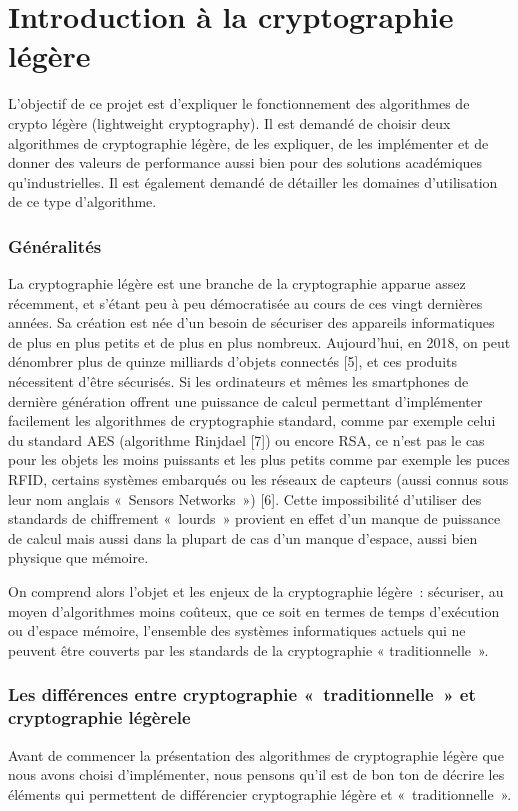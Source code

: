 \newpage
\part{Introduction à la cryptographie légère}

	L'objectif de ce projet est d'expliquer le fonctionnement des algorithmes de crypto légère (lightweight cryptography).
	Il est demandé de choisir deux algorithmes de cryptographie légère, de les expliquer,
	de les implémenter et de donner des valeurs de performance aussi bien pour des solutions académiques qu'industrielles.
	Il est également demandé de détailler les domaines d'utilisation de ce type d'algorithme.

	\section{Généralités}

	La cryptographie légère est une branche de la cryptographie apparue assez
	récemment,  et s’étant peu à peu démocratisée au cours de ces vingt dernières
	années. Sa création est née d’un besoin de sécuriser des appareils
	informatiques de plus en plus petits et de plus en plus nombreux. Aujourd’hui,
	en 2018, on peut dénombrer  plus de  quinze milliards d’objets connectés [5],
	et ces produits nécessitent d’être sécurisés. Si les ordinateurs et mêmes les
	smartphones de dernière génération offrent une puissance de calcul permettant
	d’implémenter facilement les algorithmes de cryptographie standard, comme par
	exemple celui du standard AES (algorithme Rinjdael [7]) ou encore RSA, ce
	n’est pas le cas pour les objets les moins puissants et les plus petits comme
	par exemple les puces RFID, certains systèmes embarqués ou les réseaux de
	capteurs (aussi connus sous leur nom anglais « Sensors Networks ») [6]. Cette
	impossibilité d’utiliser des standards de chiffrement « lourds » provient en
	effet d’un manque de puissance de calcul mais aussi dans la plupart de cas
	d’un manque d’espace, aussi bien physique que mémoire.

	On comprend alors l’objet et les enjeux de la cryptographie légère :
	sécuriser, au moyen d’algorithmes moins coûteux, que ce soit en termes de
	temps d’exécution ou d’espace mémoire, l’ensemble des systèmes informatiques
	actuels qui ne peuvent être couverts par les standards de la cryptographie «
	traditionnelle ».

	\section{Les différences entre cryptographie « traditionnelle » et
	cryptographie légèrele} Avant de commencer la présentation des algorithmes de
	cryptographie légère que nous avons choisi d’implémenter, nous pensons qu’il
	est de bon ton de décrire les éléments qui permettent de différencier
	cryptographie légère et « traditionnelle ».

